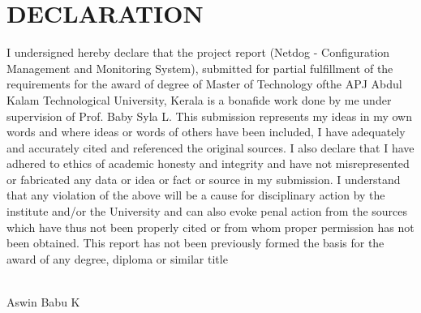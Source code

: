 \chapter*{\rm \large \bf DECLARATION}
\vspace{4.0mm}
\setlength{\parindent}{4em}
I undersigned hereby declare that the project report
(Netdog - Configuration Management and Monitoring System), submitted for partial
fulfillment of the requirements for the award of degree of Master of Technology
ofthe APJ Abdul Kalam Technological University, Kerala is a bonafide work done
by me under supervision of Prof. Baby Syla L. This submission represents my
ideas in my own words and where ideas or words of others have been included, I
have adequately and accurately cited and referenced the original sources. I also
declare that I have adhered to ethics of academic honesty and integrity and have
not misrepresented or fabricated any data or idea or fact or source in my
submission. I understand that any violation of the above will be a cause for
disciplinary action by the institute and/or the University and can also evoke
penal action from the sources which have thus not been properly cited or from
whom proper permission has not been obtained. This report has not been
previously formed the basis for the award of any degree, diploma or similar
title

\vspace{0.3 cm}

\\
\hfill {Aswin Babu K}\\

\newpage 
